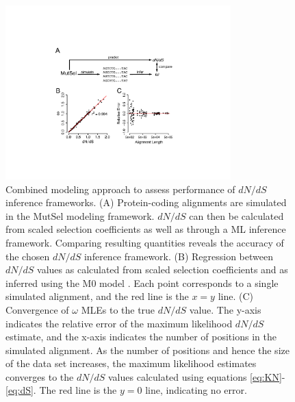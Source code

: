 \documentclass[11pt]{article}
\begin{document}
\begin{figure}[htbp]
	\centerline{\includegraphics[width=8.7cm]{figures/MainText/regression_convergence.pdf}}
	\caption{\label{reg_conv} Combined modeling approach to assess performance of $dN/dS$ inference frameworks. (A) Protein-coding alignments are simulated in the MutSel modeling framework. $dN/dS$ can then be calculated from scaled selection coefficients as well as through a ML inference framework. Comparing resulting quantities reveals the accuracy of the chosen $dN/dS$ inference framework. (B) Regression between $dN/dS$ values as calculated from scaled selection coefficients and as inferred using the M0 model \cite{GoldmanYang1994,NielsenYang1998,Yangetal2000}. Each point corresponds to a single simulated alignment, and the red line is the $x=y$ line. (C) Convergence of $\omega$ MLEs to the true $dN/dS$ value. The y-axis indicates the relative error of the maximum likelihood $dN/dS$ estimate, and the x-axis indicates the number of positions in the simulated alignment. As the number of positions and hence the size of the data set increases, the maximum likelihood estimates converges to the $dN/dS$ values calculated using equations \eqref{eq:KN}-\eqref{eq:dS}. The red line is the $y=0$ line, indicating no error.}
\end{figure}
	
\vspace{2cm}
	
\end{document}

